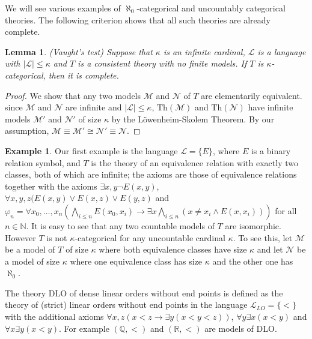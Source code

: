 \documentclass[10pt]{amsart}
\renewcommand{\L}{\mathcal{L}}
\newcommand{\QQ}{\mathbb{Q}}
\newcommand{\RR}{\mathbb{R}}
\newcommand{\NNN}{\mathbb{N}}
\newcommand{\MM}{\mathcal{M}}
\newcommand{\NN}{\mathcal{N}}
\newcommand{\Th}{\mathrm{Th}}
\newcommand{\DLO}{\mathrm{DLO}}
\newtheorem{lemma}[theorem]{Lemma}
\theoremstyle{definition}
\newtheorem{example}[theorem]{Example}
\theoremstyle{remark}
\begin{document}
We will see various examples of $\aleph_0$-categorical and uncountably categorical theories. The following criterion shows that all such theories are already complete. 

\begin{lemma} \label{Vaught's test} (Vaught's test) 
Suppose that $\kappa$ is an infinite cardinal, $\L$ is a language with $|\L|\leq\kappa$ and $T$ is a consistent theory with no finite models. If $T$ is $\kappa$-categorical, then it is complete. 
\end{lemma} 
\begin{proof} 
We show that any two models $\MM$ and $\NN$ of $T$ are elementarily equivalent. since $\MM$ and $\NN$ are infinite and $|\L|\leq\kappa$, $\Th(\MM)$ and $\Th(\NN)$ have infinite models $\MM'$ and $\NN'$ of size $\kappa$ by the L\"owenheim-Skolem Theorem. By our assumption, $\MM\equiv \MM'\cong\NN'\equiv \NN$. 
\end{proof} 

\begin{example} 
Our first example is the language $\L = \{E\}$, where $E$ is a binary relation symbol, and $T$ is the theory of an equivalence relation with exactly two classes, both of which are infinite; the axioms are those of equivalence relations together with the axioms $\exists x, y \neg E(x,y)$, $\forall x,y,z (E(x,y)\vee E(x,z)\vee E(y,z)$ and $\varphi_n=\forall x_0,\dots,x_n(\bigwedge_{i\leq n} E(x_0,x_i)\rightarrow \exists x \bigwedge_{i\leq n} (x\neq x_i\wedge E(x,x_i)))$ for all $n\in\NNN$. It is easy to see that any two countable models of $T$ are isomorphic. However $T$ is not $\kappa$-categorical for any uncountable cardinal $\kappa$. To see this, let $\MM$ be a model of $T$ of size $\kappa$ where both equivalence classes have size $\kappa$ and let $\NN$ be a model of size $\kappa$ where one equivalence class has size $\kappa$ and the other one has $\aleph_0$. 
\end{example} 

The theory $\DLO$ of dense linear orders without end points is defined as the theory of (strict) linear orders without end points in the language $\L_{LO}=\{<\}$ with the additional axioms $\forall x,z(x<z\rightarrow \exists y (x<y<z))$, $\forall y \exists x (x<y)$ and $\forall x \exists y (x<y)$. For example $(\QQ,<)$ and $(\RR,<)$ are models of $\DLO$. 
\end{document}
